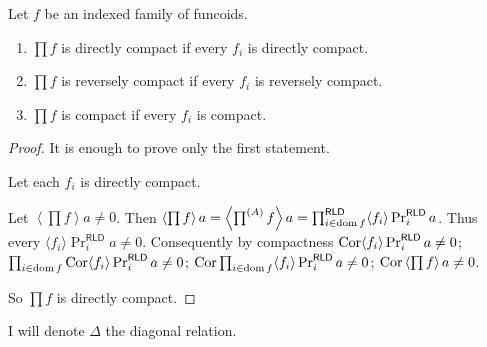 \begin{thm}
Let $f$ be an indexed family of funcoids. 

\begin{enumerate}
  \item $\prod f$ is directly compact if every $f_i$ is directly compact.
  
  \item $\prod f$ is reversely compact if every $f_i$ is reversely compact.
  
  \item $\prod f$ is compact if every $f_i$ is compact.
\end{enumerate}
\end{thm}

\begin{proof}
  It is enough to prove only the first statement.
  
  Let each $f_i$ is directly compact.
  
  Let $\left\langle \prod f \right\rangle a \neq 0$. Then $\left\langle \prod
  f \right\rangle a = \left\langle \prod^{(A)} f \right\rangle a =
  \prod^{\mathsf{RLD}}_{i \in \operatorname{dom} f} \langle f_i \rangle
  \Pr^{\mathsf{RLD}}_i a$. Thus every $\langle f_i \rangle
  \Pr^{\mathsf{RLD}}_i a \neq 0$. Consequently by compactness
  $\operatorname{Cor} \langle f_i \rangle \Pr^{\mathsf{RLD}}_i a \neq 0$;
  $\prod_{i \in \operatorname{dom} f} \operatorname{Cor} \langle f_i \rangle
  \Pr^{\mathsf{RLD}}_i a \neq 0$; $\operatorname{Cor} \prod_{i \in \operatorname{dom}
  f} \langle f_i \rangle \Pr^{\mathsf{RLD}}_i a \neq 0$; $\operatorname{Cor}
  \left\langle \prod f \right\rangle a \neq 0$.
  
  So $\prod f$ is directly compact.
\end{proof}

I will denote $\Delta$ the diagonal relation. 

